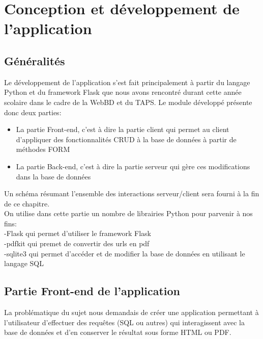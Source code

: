 \chapter{Conception et développement de l'application}
 \minitoc
 \section{Généralités}
 Le développement de l'application s'est fait principalement à partir du langage Python et du framework Flask que nous avons rencontré durant cette année scolaire dans le cadre de la WebBD et du TAPS. Le module développé présente donc deux parties: 
 \begin{itemize}
         \item La partie Front-end, c'est à dire la partie client qui permet au client d'appliquer des fonctionnalités CRUD à la base de données à partir de méthodes FORM
         \item La partie Back-end, c'est à dire la partie serveur qui gère ces modifications dans la base de données
      \end{itemize}
      Un schéma résumant l'ensemble des interactions serveur/client sera fourni à la fin de ce chapitre.\\
      
     On utilise dans cette partie un nombre de librairies Python pour parvenir à nos fins:\\
     -Flask qui permet d'utiliser le framework Flask \\
     -pdfkit qui premet de convertir des urls en pdf\\
     -sqlite3 qui permet d'accéder et de modifier la base de données en utilisant le langage SQL\\
 \section{Partie Front-end de l'application}
 La problématique du sujet nous demandais de créer une application permettant à l'utilisateur d'effectuer des requêtes (SQL ou autres) qui interagissent avec la base de données et d'en conserver le résultat sous forme HTML ou PDF.
